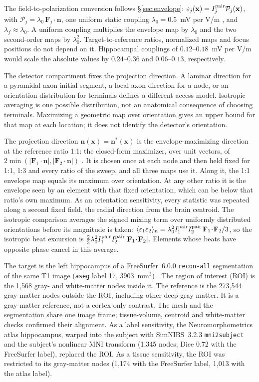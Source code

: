 The field-to-polarization conversion follows \S\ref{sec:envelope}:
$\varepsilon_j(\mathbf x)=I_j^{\rm pair}\mathcal P_j(\mathbf x)$, with
$\mathcal P_j=\lambda_0\,\mathbf F_j\!\cdot\!\mathbf n$, one uniform
static coupling $\lambda_0=0.5$~mV per V/m \cite{radman2009}, and
$\lambda_f\approx\lambda_0$. A uniform coupling multiplies the envelope map by
$\lambda_0$ and the two second-order maps by $\lambda_0^2$. Target-to-reference ratios,
normalized maps and focus positions do not depend on it. Hippocampal couplings of
$0.12$--$0.18$~mV per V/m \cite{bikson2004,deans2007} would scale the absolute values
by $0.24$--$0.36$ and $0.06$--$0.13$, respectively.

The detector compartment fixes the projection direction. A laminar direction for a pyramidal
axon initial segment, a local axon direction for a node, or an orientation
distribution for terminals defines a different access model. Isotropic averaging
is one possible distribution, not an anatomical consequence of choosing terminals.
Maximizing a geometric map over orientation gives an upper bound for that map
at each location; it does not identify the detector's orientation.

The projection direction $\mathbf n(\mathbf x)=\mathbf n^*(\mathbf x)$ is the envelope-maximizing direction at
the reference ratio 1:1: the closed-form maximizer, over unit vectors, of
$2\min(|\mathbf F_1\!\cdot\!\mathbf n|,|\mathbf F_2\!\cdot\!\mathbf n|)$
\cite{grossman2017}. It is chosen once at each node and then held fixed for 1:1, 1:3
and every ratio of the sweep, and all three maps use it. Along it, the 1:1 envelope map
equals its maximum over orientation. At any other ratio it is the envelope seen by an
element with that fixed orientation, which can be below that ratio's own maximum. As an
orientation sensitivity, every statistic was repeated along a second fixed field, the
radial direction from the brain centroid. The isotropic comparison averages the signed
mixing term over uniformly distributed orientations before its magnitude is taken:
$\langle\varepsilon_1\varepsilon_2\rangle_{\mathbf n}
=\lambda_0^2I_1^{\rm pair}I_2^{\rm pair}\,\mathbf F_1\!\cdot\!\mathbf F_2/3$, so the
isotropic beat excursion is
$\tfrac23\lambda_0^2I_1^{\rm pair}I_2^{\rm pair}|\mathbf F_1\!\cdot\!\mathbf F_2|$.
Elements whose beats have opposite phase cancel in this average.

The target is the left hippocampus of a FreeSurfer~6.0.0 \texttt{recon-all}
segmentation of the same T1 image (\texttt{aseg} label 17, 3903~mm$^3$)
\cite{fischl2002}. The region of interest (ROI) is the 1{,}568 gray- and white-matter
nodes inside it. The reference is the 273{,}544 gray-matter nodes outside the
ROI, including other deep gray matter. It is a gray-matter reference, not a cortex-only contrast.
The mesh and the segmentation share one image frame; tissue-volume, centroid and
white-matter checks confirmed their alignment. As a label sensitivity, the
Neuromorphometrics atlas hippocampus, warped into the subject with SimNIBS~3.2.3
\texttt{mni2subject} and the subject's nonlinear MNI transform (1{,}345 nodes; Dice 0.72
with the FreeSurfer label), replaced the ROI. As a tissue sensitivity, the ROI was
restricted to its gray-matter nodes (1{,}174 with the FreeSurfer label, 1{,}013 with
the atlas label).

